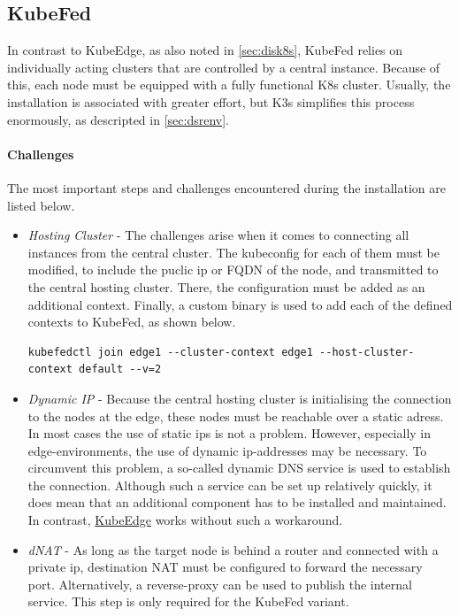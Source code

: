 \documentclass[MSC,Master,english]{twbook}%
\begin{document}
\subsection{KubeFed}
\label{sec:dsrenvkf}
In contrast to KubeEdge, as also noted in \autoref{sec:disk8s}, KubeFed relies on individually acting clusters that are controlled by a central instance. Because of this, each node must be equipped with a fully functional \ac{K8s} cluster. Usually, the installation is associated with greater effort, but K3s simplifies this process enormously, as descripted in \autoref{sec:dsrenv}. 

\paragraph{Challenges} The most important steps and challenges encountered during the installation are listed below.

\begin{itemize}
    \item \textit{Hosting Cluster} - The challenges arise when it comes to connecting all instances from the central cluster. The kubeconfig for each of them must be modified, to include the puclic ip or \ac{FQDN} of the node, and transmitted to the central hosting cluster. There, the configuration must be added as an additional context. Finally, a custom binary is used to add each of the defined contexts to \ac{KubeFed}, as shown below.

    \begin{lstlisting}[caption={KubeFed join context},captionpos=b]
    kubefedctl join edge1 --cluster-context edge1 --host-cluster-context default --v=2
    \end{lstlisting}

    \item \textit{Dynamic IP} - Because the central hosting cluster is initialising the connection to the nodes at the edge, these nodes must be reachable over a static adress. In most cases the use of static ips is not a problem. However, especially in edge-environments, the use of dynamic ip-addresses may be necessary. To circumvent this problem, a so-called dynamic \ac{DNS} service is used to establish the connection. Although such a service can be set up relatively quickly, it does mean that an additional component has to be installed and maintained. In contrast, \hyperref[sec:dsrenvke]{KubeEdge} works without such a workaround.
    
    \item \textit{dNAT} - As long as the target node is behind a router and connected with a private ip, destination \ac{NAT} must be configured to forward the necessary port. Alternatively, a reverse-proxy can be used to publish the internal service. This step is only required for the KubeFed variant. 
\end{itemize}
\end{document}
